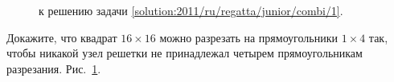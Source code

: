 \ifsolution
\begin{figure}\centering
    \caption{к решению задачи \ref{solution:2011/ru/regatta/junior/combi/1}.}
    \label{fig:solution:2011/ru/regatta/junior/combi/1}
\end{figure}
\fi %

\problem
Докажите, что квадрат $16 \times 16$ можно разрезать на прямоугольники
$1 \times 4$ так, чтобы никакой узел решетки не принадлежал четырем
прямоугольникам разрезания.
\solution
\label{solution:2011/ru/regatta/junior/combi/1}%
Рис.~\ref{fig:solution:2011/ru/regatta/junior/combi/1}.
\endproblem
